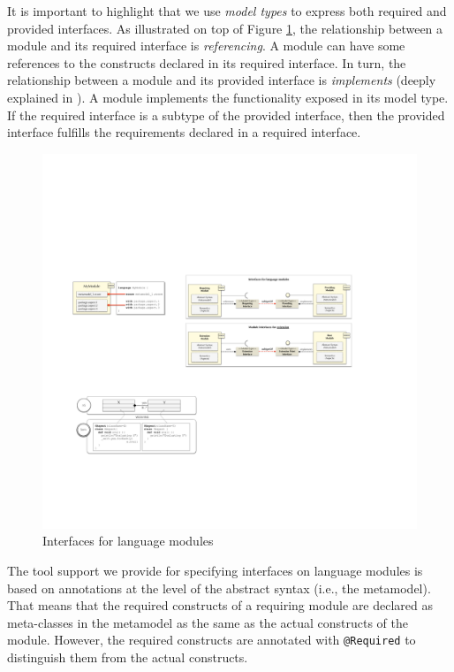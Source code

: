 It is important to highlight that we use \textit{model types} \cite{Steel:2007} to express both required and provided interfaces. As illustrated on top of Figure \ref{fig:approaches-interfaces}, the relationship between a module and its required interface is \textit{referencing}. A module can have some references to the constructs declared in its required interface. In turn, the relationship between a module and its provided interface is \textit{implements} (deeply explained in \cite{Degueule:2015}). A module implements the functionality exposed in its model type. If the required interface is a subtype of the provided interface, then the provided interface fulfills the requirements declared in a required interface. 

\begin{figure}
\centering
\includegraphics[width=1\linewidth]{images/approach-interfaces.pdf}
\caption{Interfaces for language modules}
\label{fig:approaches-interfaces}
\end{figure}

The tool support we provide for specifying interfaces on language modules is based on annotations at the level of the abstract syntax (i.e., the metamodel). That means that the required constructs of a requiring module are declared as meta-classes in the metamodel as the same as the actual constructs of the module. However, the required constructs are annotated with \texttt{@Required} to distinguish them from the actual constructs.